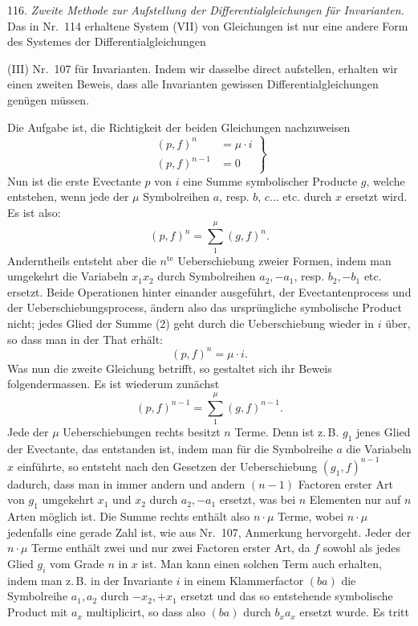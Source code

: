 \documentclass[11pt]{article}
\providecommand{\weberpage}[1]{}
\providecommand{\weq}[2]{\begin{equation}\tag{#1}#2\end{equation}}
\begin{document}
116. \textit{Zweite Methode zur Aufstellung der Differentialgleichungen für Invarianten.} Das in Nr.~114 erhaltene System (VII) von Gleichungen ist nur eine andere Form des Systemes der Differentialgleichungen


\weberpage{131}
(III) Nr.~107 für Invarianten. Indem wir dasselbe direct aufstellen, erhalten wir einen zweiten Beweis, dass alle Invarianten gewissen Differentialgleichungen genügen müssen.

Die Aufgabe ist, die Richtigkeit der beiden Gleichungen nachzuweisen
\weq{A}{
\left.
\begin{aligned}
(p,f)^n &= \mu \cdot i\\
(p,f)^{n-1} &= 0
\end{aligned}
\right\}
}
Nun ist die erste Evectante $p$ von $i$ eine Summe symbolischer Producte $g$, welche entstehen, wenn jede der $\mu$ Symbolreihen $a$, resp. $b$, $c \ldots$ etc. durch $x$ ersetzt wird. Es ist also:
\weq{2}{
(p,f)^n = \sum_1^\mu (g,f)^n.
}
Anderntheils entsteht aber die $n^{\text{te}}$ Ueberschiebung zweier Formen, indem man umgekehrt die Variabeln $x_1 x_2$ durch Symbolreihen $a_2, -a_1$, resp. $b_2, -b_1$ etc. ersetzt. Beide Operationen hinter einander ausgeführt, der Evectantenprocess und der Ueberschiebungsprocess, ändern also das ursprüngliche symbolische Product nicht; jedes Glied der Summe (2) geht durch die Ueberschiebung wieder in $i$ über, so dass man in der That erhält:
\[
(p,f)^n = \mu \cdot i.
\]
Was nun die zweite Gleichung betrifft, so gestaltet sich ihr Beweis folgendermassen. Es ist wiederum zunächst
\[
(p,f)^{n-1} = \sum_1^\mu (g,f)^{n-1}.
\]
Jede der $\mu$ Ueberschiebungen rechts besitzt $n$ Terme. Denn ist z.\,B. $g_1$ jenes Glied der Evectante, das entstanden ist, indem man für die Symbolreihe $a$ die Variabeln $x$ einführte, so entsteht nach den Gesetzen der Ueberschiebung $(g_1,f)^{n-1}$ dadurch, dass man in immer andern und andern $(n-1)$ Factoren erster Art von $g_1$ umgekehrt $x_1$ und $x_2$ durch $a_2, -a_1$ ersetzt, was bei $n$ Elementen nur auf $n$ Arten möglich ist. Die Summe rechts enthält also $n \cdot \mu$ Terme, wobei $n \cdot \mu$ jedenfalls eine gerade Zahl ist, wie aus Nr.~107, Anmerkung hervorgeht. Jeder der $n \cdot \mu$ Terme enthält zwei und nur zwei Factoren erster Art, da $f$ sowohl als jedes Glied $g_i$ vom Grade $n$ in $x$ ist. Man kann einen solchen Term auch erhalten, indem man z.\,B. in der Invariante $i$ in einem Klammerfactor $(ba)$ die Symbolreihe $a_1, a_2$ durch $-x_2, +x_1$ ersetzt und das so entstehende symbolische Product mit $a_x$ multiplicirt, so dass also $(ba)$ durch $b_x a_x$ ersetzt wurde. Es tritt
\end{document}
